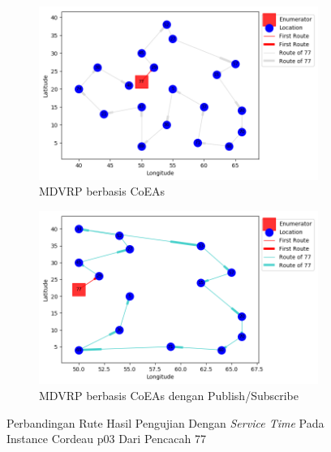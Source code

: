 \begin{figure}[H]
	\centering
	\begin{subfigure}[t]{\textwidth}
		\centering
		\includegraphics[width=\textwidth]{Resources/Images/cordeau_p03_tw/cordeau_p03_tw_77_coes}
		\caption{MDVRP berbasis CoEAs}
		\label{fig:cordeau_p03_tw_77_coes}
	\end{subfigure}
	\begin{subfigure}[t]{\textwidth}
		\centering
		\includegraphics[width=\textwidth]{Resources/Images/cordeau_p03_tw/cordeau_p03_tw_77_pubsub_coes}
		\caption{MDVRP berbasis CoEAs dengan Publish/Subscribe}
		\label{fig:cordeau_p03_tw_77_pubsub_coes}
	\end{subfigure}
	\caption{Perbandingan Rute Hasil Pengujian Dengan \textit{Service Time} Pada Instance Cordeau p03 Dari Pencacah 77}
	\label{fig:cordeau_p03_tw_77}
\end{figure}


